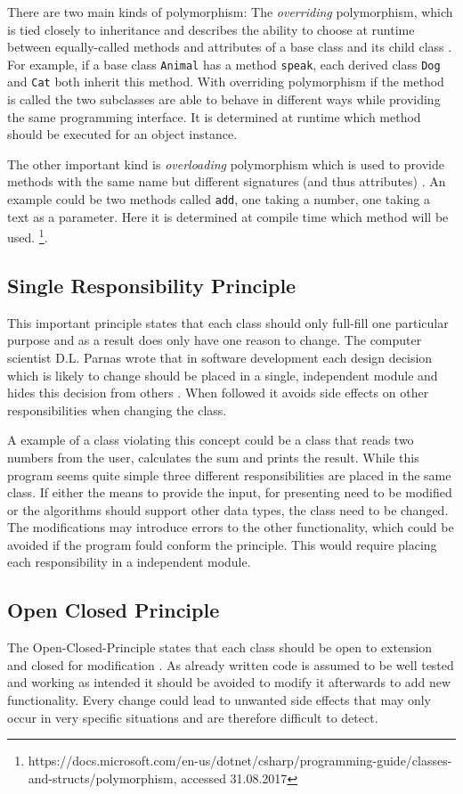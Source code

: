 There are two main kinds of polymorphism: The \emph{overriding} polymorphism, which is tied closely to inheritance and describes the ability to choose at runtime between equally-called methods and attributes of a base class and its child class \cite{coupling}. For example, if a base class \texttt{Animal} has a method \texttt{speak}, each derived class \texttt{Dog} and \texttt{Cat} both inherit this method. With overriding polymorphism if the method is called the two subclasses are able to behave in different ways while providing the same programming interface. It is determined at runtime which method should be executed for an object instance. 

The other important kind is \emph{overloading} polymorphism which is used to provide methods with the same name but different signatures (and thus attributes) \cite{data-types}. An example could be two methods called \texttt{add}, one taking a number, one taking a text as a parameter. Here it is determined at compile time which method will be used. \footnote{https://docs.microsoft.com/en-us/dotnet/csharp/programming-guide/classes-and-structs/polymorphism, accessed 31.08.2017}.

\subsection{Single Responsibility Principle}
\label{sec:srp}
This important principle states that each class should only full-fill one particular purpose and as a result does only have one reason to change. The computer scientist D.L. Parnas wrote that in software development each design decision which is likely to change should be placed in a single, independent module and hides this decision from others \cite{srp}. When followed it avoids side effects on other responsibilities when changing the class. 

A example of a class violating this concept could be a class that reads two numbers from the user, calculates the sum and prints the result. While this program seems quite simple three different responsibilities are placed in the same class. If either the means to provide the input, for presenting need to be modified or the algorithms should support other data types, the class need to be changed. The modifications may introduce errors to the other functionality, which could be avoided if the program fould conform the principle. This would require placing each responsibility in a independent module.
\subsection{Open Closed Principle}
The Open-Closed-Principle states that each class should be open to extension and closed for modification \cite{ocp}. As already written code is assumed to be well tested and working as intended it should be avoided to modify it afterwards to add new functionality. Every change could lead to unwanted side effects that may only occur in very specific situations and are therefore difficult to detect. 

